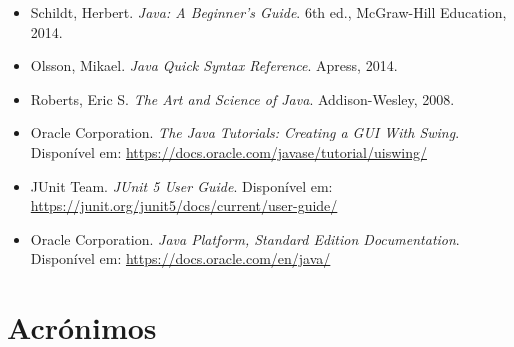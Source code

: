 \documentclass[a4paper,12pt]{article}
\begin{document}
\begin{itemize}
    \item Schildt, Herbert. \textit{Java: A Beginner's Guide}. 6th ed., McGraw-Hill Education, 2014.
    \item Olsson, Mikael. \textit{Java Quick Syntax Reference}. Apress, 2014.
    \item Roberts, Eric S. \textit{The Art and Science of Java}. Addison-Wesley, 2008.
    \item Oracle Corporation. \textit{The Java Tutorials: Creating a GUI With Swing}. Disponível em: \url{https://docs.oracle.com/javase/tutorial/uiswing/}
    \item JUnit Team. \textit{JUnit 5 User Guide}. Disponível em: \url{https://junit.org/junit5/docs/current/user-guide/}
    \item Oracle Corporation. \textit{Java Platform, Standard Edition Documentation}. Disponível em: \url{https://docs.oracle.com/en/java/}
\end{itemize}

\section*{Acrónimos}
\begin{acronym}[UBI]
\end{acronym}
\end{document}
